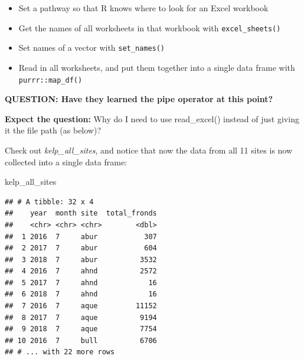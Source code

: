 \documentclass[]{book}
\newenvironment{Shaded}{\begin{snugshade}}{\end{snugshade}}
\newcommand{\KeywordTok}[1]{\textcolor[rgb]{0.13,0.29,0.53}{\textbf{#1}}}
\newcommand{\NormalTok}[1]{#1}
\newcommand{\OperatorTok}[1]{\textcolor[rgb]{0.81,0.36,0.00}{\textbf{#1}}}
\newcommand{\StringTok}[1]{\textcolor[rgb]{0.31,0.60,0.02}{#1}}
\providecommand{\tightlist}{%
  \setlength{\itemsep}{0pt}\setlength{\parskip}{0pt}}
\begin{document}
\begin{itemize}
\tightlist
\item
  Set a pathway so that R knows where to look for an Excel workbook
\item
  Get the names of all worksheets in that workbook with \texttt{excel\_sheets()}
\item
  Set names of a vector with \texttt{set\_names()}
\item
  Read in all worksheets, and put them together into a single data frame with \texttt{purrr::map\_df()}
\end{itemize}

\textbf{QUESTION: Have they learned the pipe operator at this point?}

\textbf{Expect the question:} Why do I need to use read\_excel() instead of just giving it the file path (as below)?

\begin{Shaded}
\end{Shaded}

Check out \emph{kelp\_all\_sites}, and notice that now the data from all 11 sites is now collected into a single data frame:

\begin{Shaded}
\begin{Highlighting}[]
\NormalTok{kelp_all_sites}
\end{Highlighting}
\end{Shaded}

\begin{verbatim}
## # A tibble: 32 x 4
##    year  month site  total_fronds
##    <chr> <chr> <chr>        <dbl>
##  1 2016  7     abur           307
##  2 2017  7     abur           604
##  3 2018  7     abur          3532
##  4 2016  7     ahnd          2572
##  5 2017  7     ahnd            16
##  6 2018  7     ahnd            16
##  7 2016  7     aque         11152
##  8 2017  7     aque          9194
##  9 2018  7     aque          7754
## 10 2016  7     bull          6706
## # ... with 22 more rows
\end{verbatim}
\end{document}
